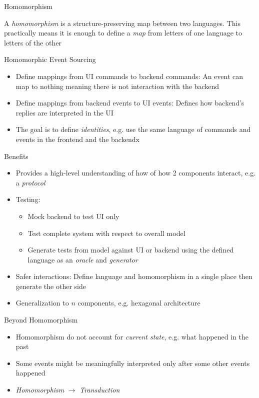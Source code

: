 \begin{frame}[fragile]{Homomorphism}

  A \emph{homomorphism} is a structure-preserving map between two languages. This practically means it is enough to
  define a \emph{map} from letters of one language to letters of the other

\end{frame}

\begin{frame}[fragile]{Homomorphic Event Sourcing}
  \begin{itemize}
  \item Define mappings from UI commands to backend commands: An event
    can map to nothing meaning there is not interaction with
    the backend
  \item Define mappings from backend events to UI events: Defines how
    backend's replies are interpreted in the UI
  \item The goal is to define \emph{identities}, e.g. use the same language of commands and events in the frontend and the backendx
  \end{itemize}
\end{frame}

\begin{frame}[fragile]{Benefits}
  \begin{itemize}
  \item Provides a high-level understanding of how of how 2 components
    interact, e.g. a \emph{protocol}
  \item Testing:
    \begin{itemize}
    \item Mock backend to test UI only
    \item Test complete system with respect to overall model
    \item Generate tests from model against UI or backend using the
      defined language as an \emph{oracle} and \emph{generator}
    \end{itemize}
  \item Safer interactions: Define language and homomorphism in a
    single place then generate the other side
  \item Generalization to $n$ components, e.g. hexagonal architecture
  \end{itemize}
\end{frame}

\begin{frame}[fragile]{Beyond Homomorphism}
  \begin{itemize}
  \item Homomorphism do not account for \emph{current state}, e.g. what happened in the past
  \item Some events might be meaningfully interpreted only after some other events happened
  \item \emph{Homomorphism} $\longrightarrow$ \emph{Transduction}
  \end{itemize}
\end{frame}

